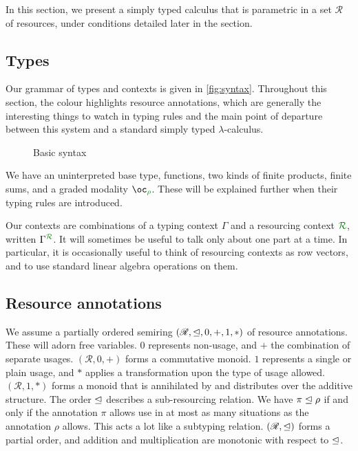 In this section, we present a simply typed calculus that is parametric in a set
$\mathscr{R}$ of resources, under conditions detailed later in the section.

\subsection{Types}

Our grammar of types and contexts is given in \autoref{fig:syntax}.
Throughout this section, the colour  highlights resource
annotations, which are generally the interesting things to watch in typing rules
and the main point of departure between this system and a standard simply typed
$\lambda$-calculus.

\begin{figure}
  \caption{Basic syntax}
  \label{fig:syntax}
\end{figure}

We have an uninterpreted base type, functions, two kinds of finite products,
finite sums, and a graded modality $\excl{\rho}{}$.
These will be explained further when their typing rules are introduced.

Our contexts are combinations of a typing context $\Gamma$ and a resourcing
context $\resctx R$, written $\ctx{\Gamma}{R}$.
It will sometimes be useful to talk only about one part at a time.
In particular, it is occasionally useful to think of resourcing contexts as row
vectors, and to use standard linear algebra operations on them.

\subsection{Resource annotations}
\label{sec:annotations}

We assume a partially ordered semiring $(\mathscr{R}, \trianglelefteq, 0, +, 1, *)$ of
resource annotations.
These will adorn free variables.
$0$ represents non-usage, and $+$ the combination of separate usages.
$(\mathscr{R}, 0, +)$ forms a commutative monoid.
$1$ represents a single or plain usage, and $*$ applies a transformation upon
the type of usage allowed.
$(\mathscr{R}, 1, *)$ forms a monoid that is annihilated by and distributes over
the additive structure.
The order $\trianglelefteq$ describes a sub-resourcing relation.
We have $\pi \trianglelefteq \rho$ if and only if the annotation $\pi$ allows use in at
most as many situations as the annotation $\rho$ allows.
This acts a lot like a subtyping relation.
$(\mathscr{R}, \trianglelefteq)$ forms a partial order, and addition and multiplication
are monotonic with respect to $\trianglelefteq$.

